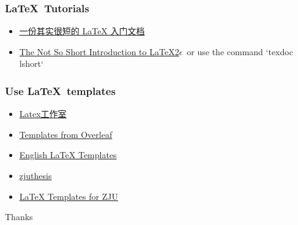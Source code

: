 \documentclass{beamer}
\begin{document}
\begin{frame}
\frametitle{\LaTeX\ Tutorials}
\begin{itemize}
	\item \href{https://liam.page/2014/09/08/latex-introduction/}{ 一份其实很短的 LaTeX 入门文档 }
	\item \href{http://tug.ctan.org/info/lshort/english/lshort.pdf}{The Not So Short Introduction to \LaTeX 2$\epsilon$}\ or use the command `texdoc lshort`
\end{itemize}
\end{frame}

\begin{frame}
\frametitle{Use \LaTeX\ templates}
\begin{itemize}
	\item \href{http://latexstudio.net/}{Latex工作室}
	\item \href{https://www.overleaf.com/latex/templates}{Templates from Overleaf}
	\item \href{http://www.latextemplates.com/}{English LaTeX Templates}
	\item \href{https://github.com/TheNetAdmin/zjuthesis}{zjuthesis}
	\item \href{http://github.com/Lucas-Wye/Latex\_template}{LaTeX Templates for ZJU}
\end{itemize}
\end{frame}

\begin{frame}
	\centering Thanks
\end{frame}
\end{document}
